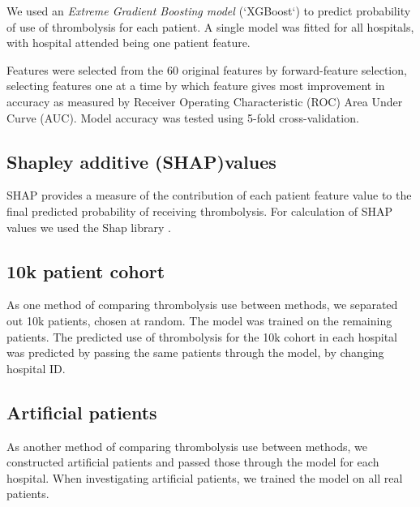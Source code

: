 We used an \emph{Extreme Gradient Boosting model \cite{chen_xgboost_2016}} (`XGBoost`) to predict probability of use of thrombolysis for each patient. A single model was fitted for all hospitals, with hospital attended being one patient feature.

Features were selected from the 60 original features by forward-feature selection, selecting features one at a time by which feature gives most improvement in accuracy as measured by Receiver Operating Characteristic (ROC) Area Under Curve (AUC). Model accuracy was tested using 5-fold cross-validation.

\subsection{Shapley additive (SHAP)values}

SHAP provides a measure of the contribution of each patient feature value to the final predicted probability of receiving thrombolysis. For calculation of SHAP values we used the Shap library \cite{lundberg_unified_2017}.

\subsection{10k patient cohort}

As one method of comparing thrombolysis use between methods, we separated out 10k patients, chosen at random. The model was trained on the remaining patients. The predicted use of thrombolysis for the 10k cohort in each hospital was predicted by passing the same patients through the model, by changing hospital ID.

\subsection{Artificial patients}

As another method of comparing thrombolysis use between methods, we constructed artificial patients and passed those through the model for each hospital. When investigating artificial patients, we trained the model on all real patients. 
